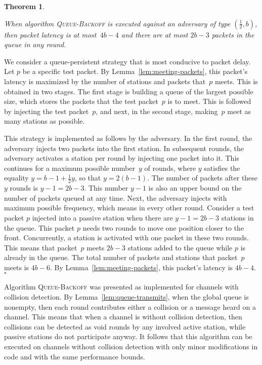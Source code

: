 \documentclass[11pt]{article}
\newcommand{\qed}{\hfill $\square$ \smallbreak}
\newenvironment{proof}{\noindent{\bf Proof:}}{\qed}
\newtheorem{theorem}{Theorem}
\begin{document}
\begin{theorem}
\label{thm:queue-algorithm}

When algorithm \textsc{Queue-Backoff} is executed against an adversary of type $(\frac{1}{2}, b)$, then packet latency is at most~$4b-4$ and there are at most $2b-3$ packets in the queue in any round.
\end{theorem}

\begin{proof} 
We consider a queue-persistent strategy that is most conducive to packet delay.
Let $p$ be a specific test packet.
By Lemma~\ref{lem:meeting-packets}, this packet's latency is maximized by the number of stations and packets that~$p$ meets.
This is obtained in two stages.
The first stage is building a queue of the largest possible size, which stores the packets that the test packet~$p$ is to meet.
This is followed by injecting the test packet~$p$, and next, in the second stage, making~$p$ meet as many stations as possible.

This strategy is implemented as follows by the adversary.
In the first round, the adversary injects two packets into the first station.
In subsequent rounds, the adversary activates a station per round by injecting one packet into it.
This continues for a maximum possible number~$y$ of rounds, where $y$ satisfies the equality $y=b-1 + \frac{1}{2}y$, so that $y=2 (b-1)$.
The number of packets  after these $y$ rounds is $y-1=2b-3$. 
This number $y-1$ is also an upper bound on the number of packets queued at any time.
Next, the adversary injects with maximum possible frequency, which means in every other round.
Consider a test packet $p$ injected into a passive station when there are $y-1=2b-3$ stations in the queue.
This packet $p$ needs two rounds to move one position closer to the front.
Concurrently, a station is activated with one packet in these two rounds.
This means that packet~$p$ meets $2b-3$ stations added to the queue while $p$ is already in the queue.
The total number of packets and stations that packet~$p$ meets is $4b-6$.
By Lemma~\ref{lem:meeting-packets}, this packet's latency is $4b-4$. 
\end{proof} 



Algorithm \textsc{Queue-Backoff} was presented as implemented for channels with collision detection.
By Lemma~\ref{lem:queue-transmits}, when the global queue is nonempty, then each round contributes either a collision or a message heard on a channel.
This means that when a channel is without collision detection, then collisions can be detected as void rounds by any involved active station, while passive stations do not participate anyway.
It follows that this algorithm can be executed on channels without collision detection with only minor modifications in code and with the same performance bounds.
\end{document}
